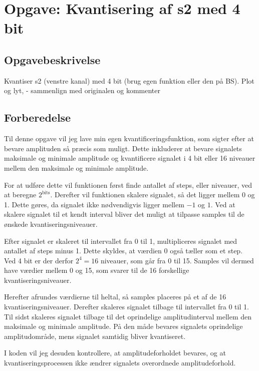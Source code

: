 \documentclass[11pt,a4paper]{report}
\begin{document}
\newpage

\section{Opgave: Kvantisering af s2 med 4 bit}
\subsection{Opgavebeskrivelse}
Kvantiser s2 (venstre kanal) med 4 bit (brug egen funktion eller den på BS).
Plot og lyt, - sammenlign med originalen og kommenter

\subsection{Forberedelse}
Til denne opgave vil jeg lave min egen kvantificeringsfunktion, som sigter efter at bevare amplituden så præcis som muligt. Dette inkluderer at bevare signalets maksimale og minimale amplitude og kvantificere signalet i 4 bit eller 16 niveauer mellem den maksimale og minimale amplitude.

For at udføre dette vil funktionen først finde antallet af steps, eller niveauer, ved at beregne \(2^{\text{bits}}\). Derefter vil funktionen skalere signalet, så det ligger mellem 0 og 1. Dette gøres, da signalet ikke nødvendigvis ligger mellem \(-1\) og \(1\). Ved at skalere signalet til et kendt interval bliver det muligt at tilpasse samples til de ønskede kvantiseringsniveauer.

Efter signalet er skaleret til intervallet fra 0 til 1, multipliceres signalet med antallet af steps minus 1. Dette skyldes, at værdien 0 også tæller som et step. Ved 4 bit er der derfor \(2^4=16\) niveauer, som går fra 0 til 15. Samples vil dermed have værdier mellem 0 og 15, som svarer til de 16 forskellige kvantiseringsniveauer.

Herefter afrundes værdierne til heltal, så samples placeres på et af de 16 kvantiseringsniveauer. Derefter skaleres signalet tilbage til intervallet fra 0 til 1. Til sidst skaleres signalet tilbage til det oprindelige amplitudinterval mellem den maksimale og minimale amplitude. På den måde bevares signalets oprindelige amplitudområde, mens signalet samtidig bliver kvantiseret.

I koden vil jeg desuden kontrollere, at amplitudeforholdet bevares, og at kvantiseringsprocessen ikke ændrer signalets overordnede amplitudeforhold.
\end{document}
